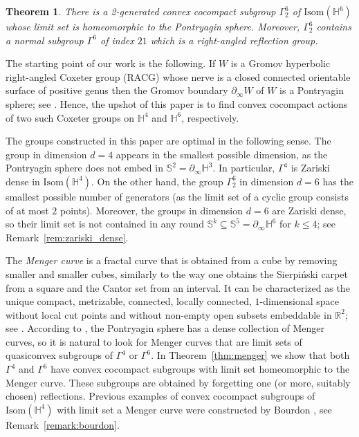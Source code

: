 \documentclass{amsart}
\theoremstyle{plain}
\newtheorem{theorem}{Theorem}[section]
\theoremstyle{definition}
\theoremstyle{remark}
\numberwithin{equation}{section}
\newcommand{\rr}{\mathbb R}
\newcommand{\hh}{\mathbb H}
\newcommand{\Sb}{\mathbb{S}}
\renewcommand{\leq}{\leqslant}
\begin{document}
\begin{theorem}\label{main6}
There is a 2-generated convex cocompact subgroup $\Gamma_2^6$ of $\mathrm{Isom} (\hh^6)$ whose limit set is homeomorphic to the Pontryagin sphere. Moreover, $\Gamma_2^6$ contains a normal subgroup $\Gamma^6$ of index $21$ which is a right-angled reflection group.
\end{theorem}


The starting point of our work is the following. If $W$ is a Gromov hyperbolic right-angled Coxeter group (RACG) whose nerve is a closed connected orientable surface of positive genus then the Gromov boundary $\partial_\infty W$ of $W$ is a Pontryagin sphere; see \cite{FI03}. 
Hence, the upshot of this paper is to find convex cocompact actions of two such Coxeter groups on $\hh^4$ and $\hh^6$, respectively.

The groups constructed in this paper are optimal in the following sense.
The group in dimension $d=4$ appears in the smallest possible dimension, as the Pontryagin sphere does not embed in $\Sb^2=\partial_\infty \hh^3$.
In particular, $\Gamma^4$ is Zariski dense in  $\mathrm{Isom} (\hh^4)$.
On the other hand, the group $\Gamma_2^6$ in dimension $d=6$ has the smallest possible number of generators (as the limit set of a cyclic group consists of at most $2$ points).
Moreover, the groups in dimension $d=6$ are Zariski dense, so their limit set is not contained in any round $\Sb^k\subseteq \Sb^5=\partial_\infty \hh^6$ for $k\leq 4$; see Remark~\ref{rem:zariski_dense}.


The \textit{Menger curve} is a  fractal curve that is obtained from a cube by removing smaller and smaller cubes, similarly to the way one obtains the  Sierpi\'nski carpet from a square and  the Cantor set from an interval.
It can be characterized as the unique compact, metrizable, connected, locally connected, $1$-dimensional space without local cut points and without non-empty open subsets embeddable in $\rr^2$; see \cite{AN58,AN58b}.
According to \cite{KP96}, the Pontryagin sphere has a dense collection of Menger curves, so it is natural to look for Menger curves that are limit sets of quasiconvex subgroups of $\Gamma^4$ or $\Gamma^6$.
In Theorem~\ref{thm:menger} we  show that both $\Gamma^4$ and $\Gamma^6$ have convex cocompact subgroups with limit set homeomorphic to the Menger curve. 
These subgroups are obtained by forgetting one (or more, suitably chosen) reflections. 
Previous examples of convex cocompact  subgroups of $\mathrm{Isom}(\hh^4)$ with limit set a Menger curve were constructed by Bourdon \cite{BO97}, see Remark~\ref{remark:bourdon}.
\end{document}
